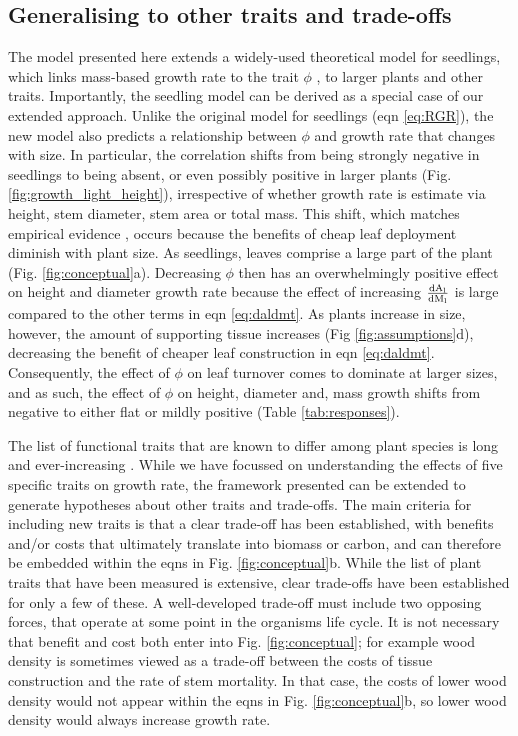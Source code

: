 \documentclass[a4paper,11pt]{article}
\begin{document}
\subsection{Generalising to other traits and trade-offs}


The model presented here extends a widely-used theoretical model for seedlings, which links mass-based growth rate to the trait $\phi$ \citep{Lambers-1992, Wright-2000}, to larger plants and other traits. Importantly, the seedling model can be derived as a special case of our extended approach. Unlike the original model for seedlings (eqn \ref{eq:RGR}), the new model also predicts a relationship between $\phi$ and growth rate that changes with size. In particular, the correlation shifts from being strongly negative in seedlings to being absent, or even possibly positive in larger plants (Fig. \ref{fig:growth_light_height}), irrespective of whether growth rate is estimate via height, stem diameter, stem area or total mass. This shift, which matches empirical evidence \citep{Poorter-2008, Wright-2010, Herault-2011, Paine-2015, Gibert-2016}, occurs because the benefits of cheap leaf deployment diminish with plant size. As seedlings, leaves comprise a large part of the plant (Fig. \ref{fig:conceptual}a). Decreasing $\phi$ then has an overwhelmingly positive effect on height and diameter growth rate because the effect of increasing $\frac{\rm{d} A_{\rm l}}{\rm{d} M_{\rm l}}$ is large compared to the other terms in eqn \ref{eq:daldmt}. As plants increase in size, however, the amount of supporting tissue increases (Fig \ref{fig:assumptions}d), decreasing the benefit of cheaper leaf construction in eqn \ref{eq:daldmt}. Consequently, the effect of $\phi$ on leaf turnover comes to dominate at larger sizes, and as such, the effect of $\phi$ on height, diameter and, mass growth shifts from negative to either flat or mildly positive  (Table \ref{tab:responses}).

The list of functional traits that are known to differ among plant species is long and ever-increasing \citep{Perez-2013}. While we have focussed on understanding the effects of five specific traits on growth rate, the framework presented can be extended to generate hypotheses about other traits and trade-offs. The main criteria for including new traits is that a clear trade-off has been established, with benefits and/or costs that ultimately translate into biomass or carbon, and can therefore be embedded within the eqns in Fig. \ref{fig:conceptual}b. While the list of plant traits that have been measured is extensive, clear trade-offs have been established for only a few of these. A well-developed  trade-off must include two opposing forces, that operate at some point in the organisms life cycle. It is not necessary that benefit and cost both enter into Fig. \ref{fig:conceptual}; for example wood density is sometimes viewed as a trade-off between the costs of tissue construction and the rate of stem mortality. In that case, the costs of lower wood density would not appear within the eqns in Fig. \ref{fig:conceptual}b, so lower wood density would always increase growth rate.
\end{document}
